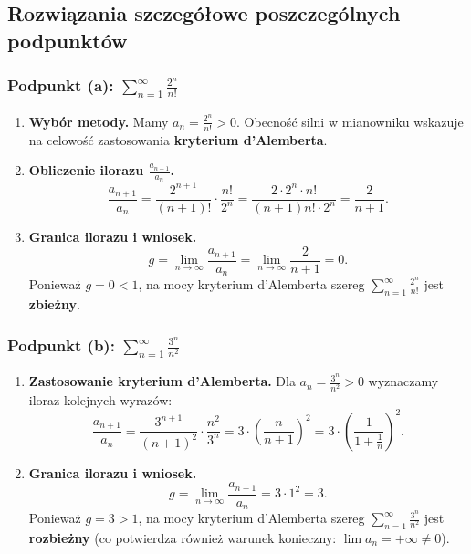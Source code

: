 \subsection*{Rozwiązania szczegółowe poszczególnych podpunktów}

\subsubsection*{Podpunkt (a): $\displaystyle \sum_{n=1}^{\infty} \frac{2^n}{n!}$}

\begin{enumerate}[label=\textbf{Krok \arabic*.},leftmargin=*]
    \item \textbf{Wybór metody.}
    Mamy $a_n = \frac{2^n}{n!} > 0$. Obecność silni w mianowniku wskazuje na celowość zastosowania \textbf{kryterium d'Alemberta}.
    \item \textbf{Obliczenie ilorazu $\frac{a_{n+1}}{a_n}$.}
    \begin{equation*}
        \frac{a_{n+1}}{a_n} = \frac{2^{n+1}}{(n+1)!} \cdot \frac{n!}{2^n} = \frac{2 \cdot 2^n \cdot n!}{(n+1)n! \cdot 2^n} = \frac{2}{n+1}.
    \end{equation*}
    \item \textbf{Granica ilorazu i wniosek.}
    \begin{equation*}
        g = \lim_{n \to \infty} \frac{a_{n+1}}{a_n} = \lim_{n \to \infty} \frac{2}{n+1} = 0.
    \end{equation*}
    Ponieważ $g = 0 < 1$, na mocy kryterium d'Alemberta szereg $\displaystyle\sum_{n=1}^{\infty} \frac{2^n}{n!}$ jest \textbf{zbieżny}.
\end{enumerate}

\subsubsection*{Podpunkt (b): $\displaystyle \sum_{n=1}^{\infty} \frac{3^n}{n^2}$}

\begin{enumerate}[label=\textbf{Krok \arabic*.},leftmargin=*]
    \item \textbf{Zastosowanie kryterium d'Alemberta.}
    Dla $a_n = \frac{3^n}{n^2} > 0$ wyznaczamy iloraz kolejnych wyrazów:
    \begin{equation*}
        \frac{a_{n+1}}{a_n} = \frac{3^{n+1}}{(n+1)^2} \cdot \frac{n^2}{3^n} = 3 \cdot \left(\frac{n}{n+1}\right)^2 = 3 \cdot \left(\frac{1}{1 + \frac{1}{n}}\right)^2.
    \end{equation*}
    \item \textbf{Granica ilorazu i wniosek.}
    \begin{equation*}
        g = \lim_{n \to \infty} \frac{a_{n+1}}{a_n} = 3 \cdot 1^2 = 3.
    \end{equation*}
    Ponieważ $g = 3 > 1$, na mocy kryterium d'Alemberta szereg $\displaystyle\sum_{n=1}^{\infty} \frac{3^n}{n^2}$ jest \textbf{rozbieżny} (co potwierdza również warunek konieczny: $\lim a_n = +\infty \neq 0$).
\end{enumerate}

